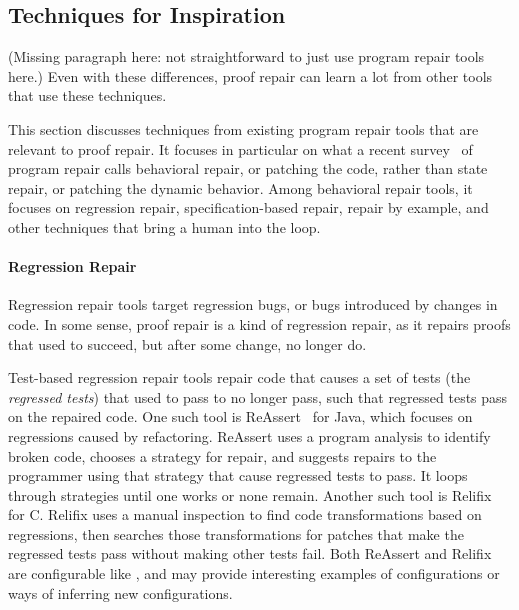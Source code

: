 \subsection{Techniques for Inspiration}
\label{sec:techniques}

(Missing paragraph here: not straightforward to just use program repair tools here.)
Even with these differences, proof repair can learn a lot from other tools that use these techniques.

This section discusses techniques from existing program repair tools that are relevant to proof repair.
It focuses in particular on what a recent survey~\cite{Monperrus:2018:ASR:3177787.3105906} of program repair calls behavioral repair,
or patching the code, rather than state repair, or patching the dynamic behavior.
Among behavioral repair tools, it focuses on regression repair, specification-based repair,
repair by example, and other techniques that bring a human into the loop.

\paragraph{Regression Repair}
Regression repair tools target regression bugs, or bugs introduced by changes in code.
In some sense, proof repair is a kind of regression repair, as it repairs
proofs that used to succeed, but after some change, no longer do.

Test-based regression repair tools repair code that causes a set of tests (the \textit{regressed tests}) that used to pass to no longer pass,
such that regressed tests pass on the repaired code.
One such tool is ReAssert~\cite{daniel2009reassert} for Java,
which focuses on regressions caused by refactoring.
ReAssert uses a program analysis to identify broken code,
chooses a strategy for repair, and suggests repairs to the programmer using that strategy that cause regressed tests to pass.
It loops through strategies until one works or none remain.
Another such tool is Relifix~\cite{Tan:2015:RAR:2818754.2818813} for C.
Relifix uses a manual inspection to find code transformations based on regressions, then searches those transformations for 
patches that make the regressed tests pass without making other tests fail.
Both ReAssert and Relifix are configurable like \sysnamelong, and may provide interesting examples of configurations
or ways of inferring new configurations.

